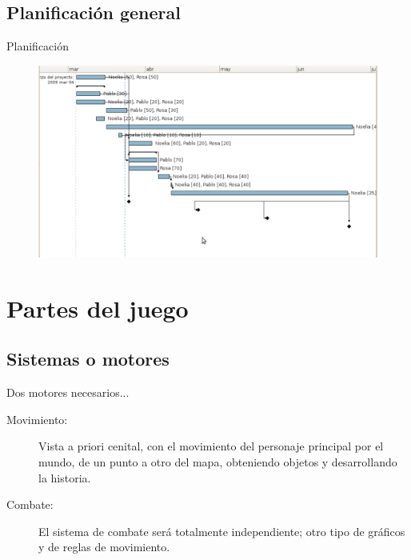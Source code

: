 \documentclass[9pt,xcolor=svgnames]{beamer}
\begin{document}
  \subsection{Planificación general}

  \begin{frame}{Planificación}
   \transdissolve
   
   \begin{figure}[t]
    \includegraphics[scale=0.27]{./Imagenes/gannt.pdf}
   \end{figure}
  \end{frame}
    

 \section{Partes del juego}
 
  \subsection{Sistemas o motores}
  
  \begin{frame}{Dos motores necesarios...}
   \transdissolve
   
   \begin{description}
    \item[Movimiento: ] Vista a priori cenital, con el movimiento del
	       personaje principal por el mundo, de un punto a otro del
	       mapa, obteniendo objetos y desarrollando la historia.
    \item[Combate: ] El sistema de combate será totalmente
	       independiente; otro tipo de gráficos y de reglas de
	       movimiento.
   \end{description}
   
  \end{frame}
  
\end{document}
